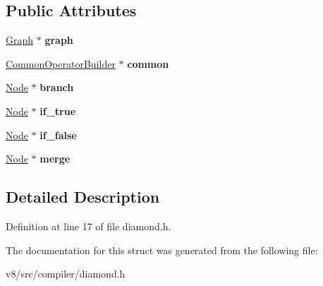 \subsection*{Public Attributes}
\begin{DoxyCompactItemize}
\item 
\mbox{\label{structv8_1_1internal_1_1compiler_1_1Diamond_ac8b3bd2954f40f5a0761c8c2b2cd110c}} 
\mbox{\hyperlink{classv8_1_1internal_1_1compiler_1_1Graph}{Graph}} $\ast$ {\bfseries graph}
\item 
\mbox{\label{structv8_1_1internal_1_1compiler_1_1Diamond_a46deb93e28010edaec798151fa131570}} 
\mbox{\hyperlink{classv8_1_1internal_1_1compiler_1_1CommonOperatorBuilder}{Common\+Operator\+Builder}} $\ast$ {\bfseries common}
\item 
\mbox{\label{structv8_1_1internal_1_1compiler_1_1Diamond_ad42656961060c0d06b2677c8811d8e12}} 
\mbox{\hyperlink{classv8_1_1internal_1_1compiler_1_1Node}{Node}} $\ast$ {\bfseries branch}
\item 
\mbox{\label{structv8_1_1internal_1_1compiler_1_1Diamond_add8bfb94c530077049748b13fb8d7406}} 
\mbox{\hyperlink{classv8_1_1internal_1_1compiler_1_1Node}{Node}} $\ast$ {\bfseries if\+\_\+true}
\item 
\mbox{\label{structv8_1_1internal_1_1compiler_1_1Diamond_acac362285997b904a29d2da366d61f8a}} 
\mbox{\hyperlink{classv8_1_1internal_1_1compiler_1_1Node}{Node}} $\ast$ {\bfseries if\+\_\+false}
\item 
\mbox{\label{structv8_1_1internal_1_1compiler_1_1Diamond_ab234093a7223e62ad377ddc285178d30}} 
\mbox{\hyperlink{classv8_1_1internal_1_1compiler_1_1Node}{Node}} $\ast$ {\bfseries merge}
\end{DoxyCompactItemize}


\subsection{Detailed Description}


Definition at line 17 of file diamond.\+h.



The documentation for this struct was generated from the following file\+:\begin{DoxyCompactItemize}
\item 
v8/src/compiler/diamond.\+h\end{DoxyCompactItemize}
